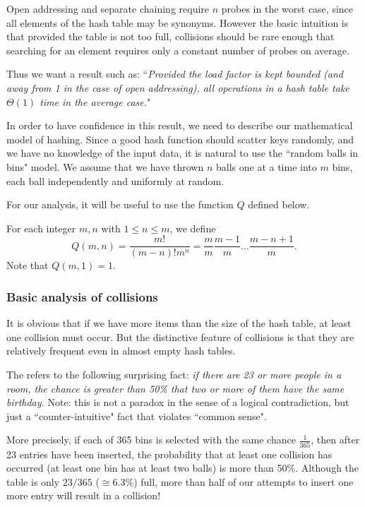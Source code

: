 Open addressing and separate chaining require $n$ probes in the worst case, 
since all elements of the hash table may be synonyms. However the basic intuition
is that provided the table is not too full, collisions should be rare enough that
searching for an element requires only a constant number of probes on average.

Thus we want a result such as: ``\emph{Provided the load factor is kept bounded 
(and away from 1 in the case of open addressing), all operations in a hash table 
take $\Theta(1)$ time in the average case.}"

In order to have confidence in this result, we need to describe our mathematical model of 
hashing. Since a good hash function should scatter keys randomly, and we have no
knowledge of the input data, it is natural to use the ``random balls in bins" 
model. We assume that we have thrown $n$ balls one at a time into $m$ bins, 
each ball independently and uniformly at random. 

For our analysis, it will be useful to use the function $Q$ defined below.
 
\begin{Definition}
For each integer $m, n$ with $1 \leq n \leq m$, we define 
$$
Q(m,n) = \frac{m!}{(m-n)! m^n} = \frac{m}{m} \frac{m-1}{m} \dots 
\frac{m - n + 1}{m}.
$$
Note that $Q(m,1) = 1$.
\end{Definition}

\subsubsection{Basic analysis of collisions}

It is obvious that if we have more items than the size of the hash table, at least 
one collision must occur. But the distinctive feature of collisions is that they 
are relatively frequent even in almost empty hash tables. 

The  refers to the following surprising fact:
\emph{if there are 23 or more people in a room, the chance is greater than 50\%
that two or more of them have the same birthday.} Note: this is not a paradox 
in the sense of a logical contradiction, but just a ``counter-intuitive" 
fact that violates ``common sense".

More precisely, if each of 365 bins
is selected with the same chance \(\frac{1}{365}\), then after
23 entries have been inserted, the probability that at least one collision has 
occurred (at least one bin has at least two balls) is more than 50\%. 
Although the table is only $23/365$ ($\cong 6.3\%$) full,
more than half of our attempts to insert one more entry will result in a collision!


